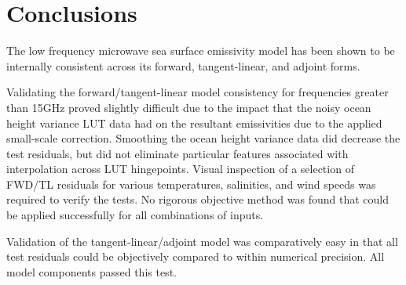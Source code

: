 \section{Conclusions}
The low frequency microwave sea surface emissivity model has been shown to be internally consistent across its forward, tangent-linear, and adjoint forms.

Validating the forward/tangent-linear model consistency for frequencies greater than 15GHz proved slightly difficult due to the impact that the noisy ocean height variance LUT data had on the resultant emissivities due to the applied small-scale correction. Smoothing the ocean height variance data did decrease the test residuals, but did not eliminate particular features associated with interpolation across LUT hingepoints. Visual inspection of a selection of FWD/TL residuals for various temperatures, salinities, and wind speeds was required to verify the tests. No rigorous objective method was found that could be applied successfully for all combinations of inputs.

Validation of the tangent-linear/adjoint model was comparatively easy in that all test residuals could be objectively compared to within numerical precision. All model components passed this test. 

